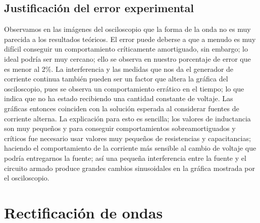 \documentclass[a4paper,12pt]{report}
\begin{document}
\section{Justificación del error experimental}
Observamos en las imágenes del osciloscopio que la forma de la onda no es muy parecida a los resultados teóricos. El error puede deberse a que a menudo es muy difícil conseguir un comportamiento críticamente amortiguado, sin embargo; lo ideal podría ser muy cercano; ello se observa en nuestro porcentaje de error que es menor al 2\%. La interferencia y las medidas que nos da el generador de corriente continua también pueden ser un factor que altera la gráfica del osciloscopio, pues se observa un comportamiento errático en el tiempo; lo que indica que no ha estado recibiendo una cantidad constante de voltaje. Las gráficas entonces coinciden con la solución esperada al considerar fuentes de corriente alterna. La explicación para esto es sencilla; los valores de inductancia son muy pequeños y para conseguir comportamientos sobreamortiguados y críticos fue necesario usar valores muy pequeños de resistencias y capacitancias; haciendo el comportamiento de la corriente más sensible al cambio de voltaje que podría entregarnos la fuente; así una pequeña interferencia entre la fuente y el circuito armado produce grandes cambios sinusoidales en la gráfica mostrada por el osciloscopio.
\chapter{Rectificación de ondas}
\end{document}
